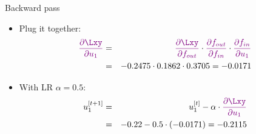 \begin{vbframe}{Backward pass}
  \begin{itemize}
    \item Plug it together:
  \begin{eqnarray*}
    \textcolor{violet}{\frac{\partial \Lxy}{\partial u_1}} &=& \textcolor{violet}{\frac{\partial \Lxy}{\partial f_{out}}} \cdot \textcolor{violet}{\frac{\partial f_{out}}{\partial f_{in}}} \cdot \textcolor{violet}{\frac{\partial f_{in}}{\partial u_1}} \\
                                        &=& \num[round-mode=places,round-precision=4]{-0.2474531} \cdot \num[round-mode=places,round-precision=4]{0.1862201} \cdot \num[round-mode=places,round-precision=4]{0.3705169} = \num[round-mode=places,round-precision=4]{-0.01707369}
  \end{eqnarray*}
    \begin{figure}
      \centering
    \end{figure}

\item  With LR $\alpha = 0.5$:
    \begin{eqnarray*}
      u_1^{[t+1]} &=& u_1^{[t]} - \alpha \cdot \textcolor{violet}{\frac{\partial \Lxy}{\partial u_1}} \\
                &=& -0.22 - 0.5 \cdot (\num[round-mode=places,round-precision=4]{-0.01707369}) = \num[round-mode=places,round-precision=4]{-0.2114632}
    \end{eqnarray*}
  \end{itemize}
\framebreak


\end{vbframe}
